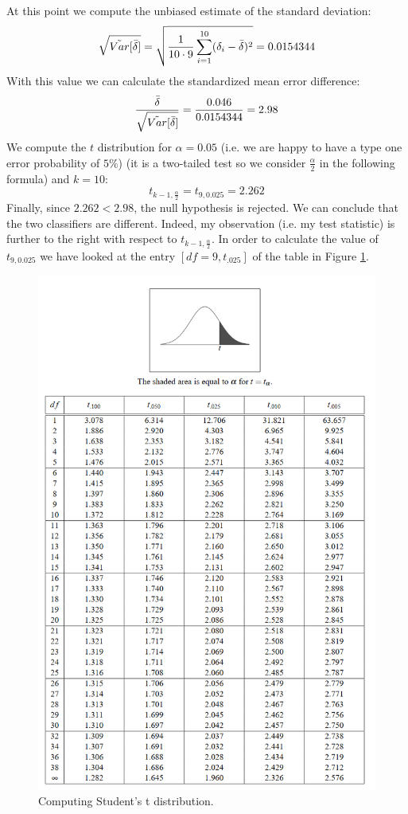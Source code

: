 At this point we compute the unbiased estimate of the standard deviation:
$$\sqrt{\tilde{Var}[\Bar{\delta}]} = \sqrt{\frac{1}{10 \cdot 9} \sum_{i=1}^{10} (\delta_i - \Bar{\delta})^2} = 0.0154344$$
With this value we can calculate the standardized mean error difference:
$$\frac{\Bar{\delta}}{\sqrt{\tilde{Var}[\Bar{\delta}]}} = \frac{0.046}{0.0154344} = 2.98$$
We compute the $t$ distribution for $\alpha=0.05$ (i.e. we are happy to have a type one error probability of $5\%$) (it is a two-tailed test so we consider $\frac{\alpha}{2}$ in the following formula) and $k=10$:
$$t_{k-1, \frac{\alpha}{2}} = t_{9,0.025} = 2.262$$
Finally, since $2.262 < 2.98$, the null hypothesis is rejected. We can conclude that the two classifiers are different. Indeed, my observation (i.e. my test statistic) is further to the right with respect to $t_{k-1, \frac{\alpha}{2}}$.
In order to calculate the value of $t_{9,0.025}$ we have looked at the entry $[d f = 9, t_.025]$ of the table in Figure \ref{fig:tDistributionTable}. \newline

\begin{figure}
    \centering
    \includegraphics[width=\textwidth]{images/tableTDistribution.png}
    \caption{Computing Student's t distribution.}
    \label{fig:tDistributionTable}
\end{figure}

